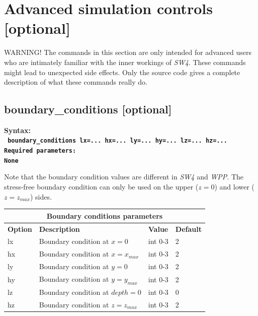 \documentclass[11pt]{report}
\begin{document}
{\section{Advanced simulation controls [optional]}

WARNING! The commands in this section are only intended for advanced users who are intimately
familiar with the inner workings of \emph{SW4}. These commands might lead to unexpected side
effects. Only the source code gives a complete description of what these commands really do.
\subsection{boundary\_conditions [optional]}
\label{keyword:boundary_conditions}
\begin{flushleft}\bf
	Syntax:\\
	\tt
	boundary\_conditions lx=... hx=... ly=... hy=... lz=... hz=...
	\\
	\bf Required parameters:\\
	\rm
	None
\end{flushleft}
Note that the boundary condition values are different in \emph{SW4} and \emph{WPP}.
The stress-free boundary condition can only be used on the upper ($z=0$) and
lower ($z=z_{max}$) sides.
\begin{center}
	\begin{tabular}{|l|p{10cm}|l|l|} \hline
		\multicolumn{4}{|c|}{\bf Boundary conditions parameters}                    \\ \hline
		\bf{Option} & \bf{Description}                  & \bf{Value} & \bf{Default} \\ \hline \hline
		lx          & Boundary condition at $x=0$       & int 0-3    & 2            \\ \hline
		hx          & Boundary condition at $x=x_{max}$ & int 0-3    & 2            \\ \hline
		ly          & Boundary condition at $y=0$       & int 0-3    & 2            \\ \hline
		hy          & Boundary condition at $y=y_{max}$ & int 0-3    & 2            \\ \hline
		lz          & Boundary condition at $depth=0 $  & int 0-3    & 0            \\ \hline
		hz          & Boundary condition at $z=z_{max}$ & int 0-3    & 2            \\ \hline
	\end{tabular}
\end{center}

}
\end{document}

